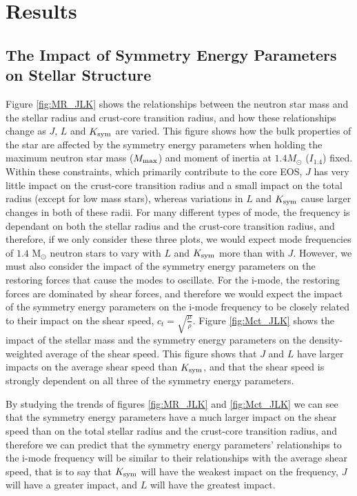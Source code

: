 \documentclass[fleqn,usenatbib]{mnras}
\begin{document}
\section{Results}
\subsection{The Impact of Symmetry Energy Parameters on Stellar Structure} \label{sec:stellar_structure}
\hspace{\parindent}Figure \ref{fig:MR_JLK} shows the relationships between the neutron star mass and the stellar radius and crust-core transition radius, and how these relationships change as $J$, $L$ and $K_{\rm sym}$ are varied. This figure shows how the bulk properties of the star are affected by the symmetry energy parameters when holding the maximum neutron star mass ($M_{\rm max}$) and moment of inertia at $1.4 M_\odot$ ($I_{1.4}$) fixed. Within these constraints, which primarily contribute to the core EOS, $J$ has very little impact on the crust-core transition radius and a small impact on the total radius (except for low mass stars), whereas variations in $L$ and $K_{\rm sym}$ cause larger changes in both of these radii. For many different types of mode, the frequency is dependant on both the stellar radius and the crust-core transition radius, and therefore, if we only consider these three plots, we would expect mode frequencies of $1.4$ M$_{\odot}$ neutron stars to vary with $L$ and $K_{\rm sym}$ more than with $J$. However, we must also consider the impact of the symmetry energy parameters on the restoring forces that cause the modes to oscillate. For the i-mode, the restoring forces are dominated by shear forces, and therefore we would expect the impact of the symmetry energy parameters on the i-mode frequency to be closely related to their impact on the shear speed, $c_t=\sqrt{\frac{\mu}{\rho}}$. Figure \ref{fig:Mct_JLK} shows the impact of the stellar mass and the symmetry energy parameters on the density-weighted average of the shear speed. This figure shows that $J$ and $L$ have larger impacts on the average shear speed than $K_{\rm sym}$, and that the shear speed is strongly dependent on all three of the symmetry energy parameters.


By studying the trends of figures \ref{fig:MR_JLK} and \ref{fig:Mct_JLK} we can see that the symmetry energy parameters have a much larger impact on the shear speed than on the total stellar radius and the crust-core transition radius, and therefore we can predict that the symmetry energy parameters' relationships to the i-mode frequency will be similar to their relationships with the average shear speed, that is to say that $K_{\rm sym}$ will have the weakest impact on the frequency, $J$ will have a greater impact, and $L$ will have the greatest impact.
\end{document}
